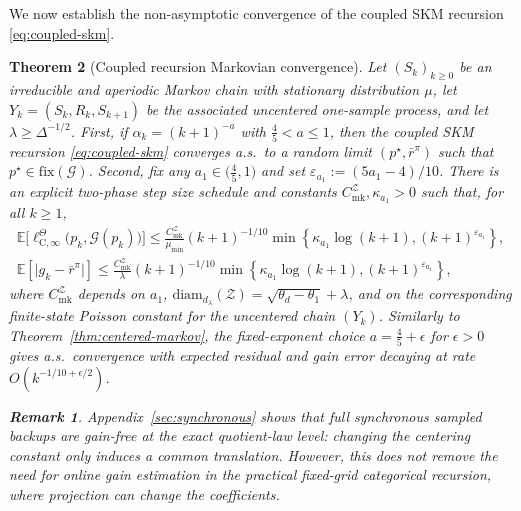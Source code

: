 \documentclass{article}
\newtheorem{theorem}{Theorem}
\newtheorem{remark}[theorem]{Remark}
\newcommand{\E}{\mathbb{E}}
\begin{document}
We now establish the non-asymptotic convergence of the coupled SKM recursion \eqref{eq:coupled-skm}. 
\begin{theorem}[Coupled recursion Markovian convergence]\label{thm:online-main}
Let $(S_k)_{k\ge 0}$ be an irreducible and aperiodic Markov chain with stationary distribution $\mu$, let $Y_k = (S_k, R_k, S_{k+1})$ be the associated uncentered one-sample process, and let $\lambda \ge \Delta^{-1/2}$. First, if $\alpha_k = (k+1)^{-a}$ with $\frac{4}{5} < a \le 1$, then the coupled SKM recursion \eqref{eq:coupled-skm} converges a.s.\ to a random limit $(p^\star, \bar r^\pi)$ such that $p^\star \in \mathrm{fix}(\mathcal G)$. Second, fix any $a_1 \in \bigl(\frac{4}{5}, 1\bigr)$ and set $\varepsilon_{a_1}:=(5a_1-4)/10$. There is an explicit two-phase step size schedule and constants $C^{\mathcal Z}_{\mathrm{mk}}, \kappa_{a_1} >0$ such that, for all $k \ge 1$, 
\begin{equation}
\begin{gathered}
\E\bigl[\ell^\Theta_{\mathrm C, \infty}\bigl(p_k, \mathcal G(p_k)\bigr)\bigr] \le \frac{C^{\mathcal Z}_{\mathrm{mk}}}{\mu_{\min}}(k+1)^{-1/10}\min \left\{\kappa_{a_1} \log (k+1), (k+1)^{\varepsilon_{a_1}} \right\},\\ 
\E[\lvert g_k - \bar r^\pi \rvert] \le \frac{C^{\mathcal Z}_{\mathrm {mk}}}{\lambda}(k+1)^{-1/10}\min \left\{\kappa_{a_1} \log (k+1), (k+1)^{\varepsilon_{a_1}} \right\},
\end{gathered}
\end{equation}
where $C_{\mathrm{mk}}^{\mathcal Z}$ depends on $a_1$, $\mathrm{diam}_{d_\lambda}(\mathcal Z) = \sqrt{\theta_d - \theta_1} + \lambda$, 
and on the corresponding finite-state Poisson constant for the uncentered chain $(Y_k)$. Similarly to Theorem~\ref{thm:centered-markov}, the fixed-exponent choice $a = \frac{4}{5}+\epsilon$ for  $\epsilon >0$ gives a.s.\ convergence with expected residual and gain error decaying at rate $O(k^{-1/10+\epsilon/2})$.

\begin{remark}
Appendix~\ref{sec:synchronous} shows that full synchronous sampled backups are gain-free at the exact quotient-law level: changing the centering constant only induces a common translation. However, this does not remove the need for online gain estimation in the practical fixed-grid categorical recursion, where projection can change the coefficients.
\end{remark}

\end{theorem}
\end{document}
